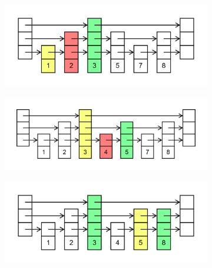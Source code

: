 \documentclass[11pt,a4paper]{article}
\begin{document}
\begin{loesung}
\begin{enumerate}
\begin{figure}[h!]
\begin{subfigure}[b]{0.45\textwidth}
            \end{subfigure}
        \end{figure}
        \begin{figure}[h!]
            \centering
            \begin{subfigure}[b]{0.45\textwidth}
                \centering
                \includegraphics[scale=0.14]{img/2a/6}
            \end{subfigure}
            \begin{subfigure}[b]{0.45\textwidth}
                \centering
                \includegraphics[scale=0.14]{img/2a/7}
            \end{subfigure}
        \end{figure}
        \begin{figure}[h!]
            \centering
            \begin{subfigure}[b]{0.45\textwidth}
                \centering
                \includegraphics[scale=0.15]{img/2a/8}
            \end{subfigure}

\end{figure}
\end{enumerate}
\end{loesung}
\end{document}
